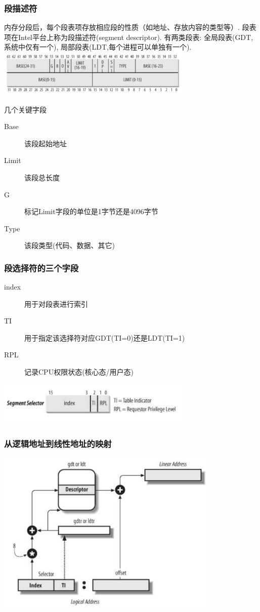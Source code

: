 \documentclass[xcolor=svgnames]{beamer}
\begin{document}
\begin{CJK*}{UTF8}{gbsn}
\begin{frame}[fragile]
\frametitle{段描述符}
内存分段后，每个段表项存放相应段的性质（如地址、存放内容的类型等）.
段表项在Intel平台上称为段描述符(segment descriptor).
有两类段表: 全局段表(GDT,系统中仅有一个), 局部段表(LDT,每个进程可以单独有一个).
\includegraphics[width=0.7\textwidth]{descriptor.png}
\begin{block}{几个关键字段}
\begin{description}
\item[Base] 该段起始地址
\item[Limit] 该段总长度
\item[G] 标记Limit字段的单位是1字节还是4096字节
\item[Type] 该段类型(代码、数据、其它)
\end{description}
\end{block}
\end{frame}


\begin{frame}[fragile]
\frametitle{段选择符的三个字段}
\begin{description}
\item[index] 用于对段表进行索引
\item[TI] 用于指定该选择符对应GDT(TI=0)还是LDT(TI=1)
\item[RPL] 记录CPU权限状态(核心态/用户态)
\end{description}

\includegraphics[width=0.7\textwidth]{selector.png}
\end{frame}

\begin{frame}[fragile]
\frametitle{从逻辑地址到线性地址的映射}
\includegraphics[width=0.8\textwidth]{segunit.png}
\end{frame}


\end{CJK*}
\end{document}
